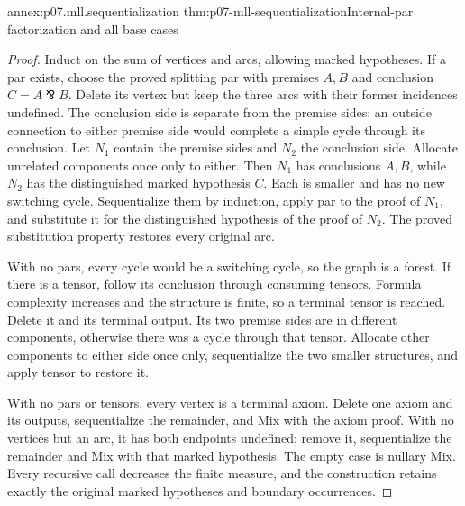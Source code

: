\begin{annexitem}{annex:p07.mll.sequentialization}
 {thm:p07-mll-sequentialization}{Internal-par factorization and all base cases}
\begin{proof}
Induct on the sum of vertices and arcs, allowing marked hypotheses.
If a par exists, choose the proved splitting par with premises \(A,B\)
and conclusion \(C=A\bindnasrepma B\). Delete its vertex but keep
the three arcs with their former incidences undefined.
The conclusion side is separate from the premise sides: an outside
connection to either premise side would complete a simple cycle
through its conclusion. Let \(N_1\) contain the premise sides and
\(N_2\) the conclusion side. Allocate unrelated components once only
to either. Then \(N_1\) has conclusions \(A,B\), while \(N_2\)
has the distinguished marked hypothesis \(C\).
Each is smaller and has no new switching cycle.
Sequentialize them by induction, apply par to the proof of \(N_1\),
and substitute it for the distinguished hypothesis of the proof of
\(N_2\). The proved substitution property restores every original arc.

With no pars, every cycle would be a switching cycle, so the graph is
a forest. If there is a tensor, follow its conclusion through consuming
tensors. Formula complexity increases and the structure is finite,
so a terminal tensor is reached. Delete it and its terminal output.
Its two premise sides are in different components, otherwise there
was a cycle through that tensor. Allocate other components to either
side once only, sequentialize the two smaller structures, and apply
tensor to restore it.

With no pars or tensors, every vertex is a terminal axiom.
Delete one axiom and its outputs, sequentialize the remainder, and
Mix with the axiom proof. With no vertices but an arc, it has both
endpoints undefined; remove it, sequentialize the remainder and Mix
with that marked hypothesis. The empty case is nullary Mix.
Every recursive call decreases the finite measure, and the construction
retains exactly the original marked hypotheses and boundary occurrences.
\end{proof}
\end{annexitem}

